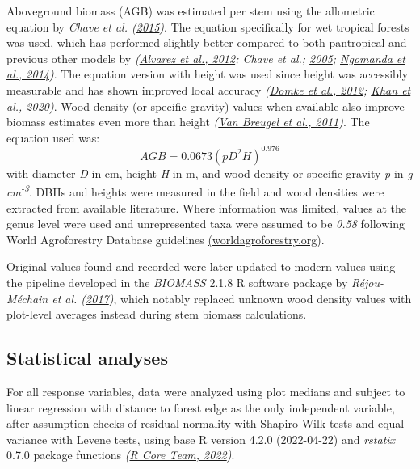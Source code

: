 \documentclass[
  12pt,
]{article}
\begin{document}
Aboveground biomass (AGB) was estimated per stem using the allometric equation by \emph{Chave et al. (\protect\hyperlink{ref-chave15}{2015})}.
The equation specifically for wet tropical forests was used, which has performed slightly better compared to both pantropical and previous other models by \emph{(\protect\hyperlink{ref-alvarez12}{Alvarez et al., 2012}; Chave et al.; \protect\hyperlink{ref-chave05}{2005}; \protect\hyperlink{ref-ngomanda14}{Ngomanda et al., 2014})}.
The equation version with height was used since height was accessibly measurable and has shown improved local accuracy \emph{(\protect\hyperlink{ref-domke12}{Domke et al., 2012}; \protect\hyperlink{ref-khan20}{Khan et al., 2020})}.
Wood density (or specific gravity) values when available also improve biomass estimates even more than height \emph{(\protect\hyperlink{ref-vanbreugel11}{Van Breugel et al., 2011})}.
The equation used was:
\[{AGB} = 0.0673 (p D^2 H)^{0.976}\]
with diameter \emph{D} in cm, height \emph{H} in m, and wood density or specific gravity \emph{p} in \emph{g cm\textsuperscript{-3}}.
DBHs and heights were measured in the field and wood densities were extracted from available literature.
Where information was limited, values at the genus level were used and unrepresented taxa were assumed to be \emph{0.58} following World Agroforestry Database guidelines \href{worldagroforestry.org}{(worldagroforestry.org)}.

Original values found and recorded were later updated to modern values using the pipeline developed in the \emph{BIOMASS} 2.1.8 R software package by \emph{Réjou-Méchain et al. (\protect\hyperlink{ref-rejou-mechain17}{2017})}, which notably replaced unknown wood density values with plot-level averages instead during stem biomass calculations.

\hypertarget{statistical-analyses}{%
\subsection{Statistical analyses}\label{statistical-analyses}}

For all response variables, data were analyzed using plot medians and subject to linear regression with distance to forest edge as the only independent variable, after assumption checks of residual normality with Shapiro-Wilk tests and equal variance with Levene tests, using base R version 4.2.0 (2022-04-22) and \emph{rstatix} 0.7.0 package functions \emph{(\protect\hyperlink{ref-base}{R Core Team, 2022})}.
\end{document}

